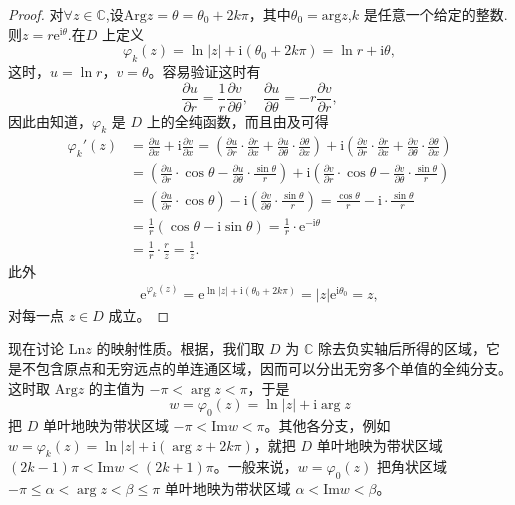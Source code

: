 \documentclass[../../main.tex]{subfiles}%
\begin{document}
\begin{proof}
对\(\forall z\in \mathbb{C} \),设\(\mathrm{Arg}z = \theta = \theta_0 + 2k\pi \)，其中$\theta_0=\mathrm{arg}z$,\( k \) 是任意一个给定的整数.则$z=r\mathrm{e}^{\mathrm{i}\theta}$.在\( D \) 上定义
\[
\varphi_{k}(z) = \ln|z| + \mathrm{i}(\theta_0 + 2k\pi) = \ln r + \mathrm{i}\theta,
\]
这时，\( u = \ln r \)，\( v = \theta \)。容易验证这时有
\[
\frac{\partial u}{\partial r} = \frac{1}{r} \frac{\partial v}{\partial \theta},\quad 
\frac{\partial u}{\partial \theta} = -r \frac{\partial v}{\partial r},
\]
因此由知道，\( \varphi_{k} \) 是 \( D \) 上的全纯函数，而且由及可得
\begin{align*}
\varphi _{k}'(z)&=\frac{\partial u}{\partial x}+\mathrm{i}\frac{\partial v}{\partial x}=\left( \frac{\partial u}{\partial r}\cdot \frac{\partial r}{\partial x}+\frac{\partial u}{\partial \theta}\cdot \frac{\partial \theta}{\partial x} \right) +\mathrm{i}\left( \frac{\partial v}{\partial r}\cdot \frac{\partial r}{\partial x}+\frac{\partial v}{\partial \theta}\cdot \frac{\partial \theta}{\partial x} \right) 
\\
&=\left( \frac{\partial u}{\partial r}\cdot \cos \theta -\frac{\partial u}{\partial \theta}\cdot \frac{\sin \theta}{r} \right) +\mathrm{i}\left( \frac{\partial v}{\partial r}\cdot \cos \theta -\frac{\partial v}{\partial \theta}\cdot \frac{\sin \theta}{r} \right) 
\\
&=\left( \frac{\partial u}{\partial r}\cdot \cos \theta \right) -\mathrm{i}\left( \frac{\partial v}{\partial \theta}\cdot \frac{\sin \theta}{r} \right) =\frac{\cos \theta}{r}-\mathrm{i}\cdot \frac{\sin \theta}{r}
\\
&=\frac{1}{r}\left( \cos \theta -\mathrm{i}\sin \theta \right) =\frac{1}{r}\cdot \mathrm{e}^{-\mathrm{i}\theta}
\\
&=\frac{1}{r}\cdot \frac{r}{z}=\frac{1}{z}.
\end{align*}
此外
\begin{align*}
\mathrm{e}^{\varphi_k(z)} = \mathrm{e}^{\ln|z| + \mathrm{i}(\theta_0 + 2k\pi)} = |z| \mathrm{e}^{\mathrm{i}\theta_0} = z,
\end{align*}
对每一点 \( z \in D \) 成立。
\end{proof}

现在讨论 \( \mathrm{Ln} z \) 的映射性质。根据，我们取 \( D \) 为 \( \mathbb{C} \) 除去负实轴后所得的区域，它是不包含原点和无穷远点的单连通区域，因而可以分出无穷多个单值的全纯分支。这时取 \( \mathrm{Arg} z \) 的主值为 \( -\pi < \arg z < \pi \)，于是
\[
w = \varphi_0(z) = \ln|z| + \mathrm{i}\arg z
\]
把 \( D \) 单叶地映为带状区域 \( -\pi < \mathrm{Im} w < \pi \)。其他各分支，例如 \( w = \varphi_k(z)=\ln|z| + \mathrm{i}(\arg z + 2k\pi) \)，就把 \( D \) 单叶地映为带状区域 \( (2k - 1)\pi < \mathrm{Im} w < (2k + 1)\pi \)。一般来说，\( w = \varphi_0(z) \) 把角状区域 \( -\pi \leqslant \alpha < \arg z < \beta \leqslant \pi \) 单叶地映为带状区域 \( \alpha < \mathrm{Im} w < \beta \)。
\end{document}
